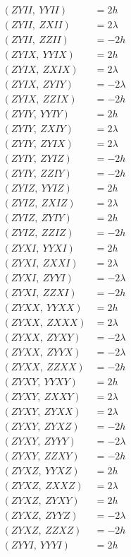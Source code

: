 \documentclass{article}
\begin{document}
\begin{align*}
  (ZYII,\ YYII) &= 2 h \\
  (ZYII,\ ZXII) &= 2 \lambda \\
  (ZYII,\ ZZII) &= - 2 h \\
  (ZYIX,\ YYIX) &= 2 h \\
  (ZYIX,\ ZXIX) &= 2 \lambda \\
  (ZYIX,\ ZYIY) &= - 2 \lambda \\
  (ZYIX,\ ZZIX) &= - 2 h \\
  (ZYIY,\ YYIY) &= 2 h \\
  (ZYIY,\ ZXIY) &= 2 \lambda \\
  (ZYIY,\ ZYIX) &= 2 \lambda \\
  (ZYIY,\ ZYIZ) &= - 2 h \\
  (ZYIY,\ ZZIY) &= - 2 h \\
  (ZYIZ,\ YYIZ) &= 2 h \\
  (ZYIZ,\ ZXIZ) &= 2 \lambda \\
  (ZYIZ,\ ZYIY) &= 2 h \\
  (ZYIZ,\ ZZIZ) &= - 2 h \\
  (ZYXI,\ YYXI) &= 2 h \\
  (ZYXI,\ ZXXI) &= 2 \lambda \\
  (ZYXI,\ ZYYI) &= - 2 \lambda \\
  (ZYXI,\ ZZXI) &= - 2 h \\
  (ZYXX,\ YYXX) &= 2 h \\
  (ZYXX,\ ZXXX) &= 2 \lambda \\
  (ZYXX,\ ZYXY) &= - 2 \lambda \\
  (ZYXX,\ ZYYX) &= - 2 \lambda \\
  (ZYXX,\ ZZXX) &= - 2 h \\
  (ZYXY,\ YYXY) &= 2 h \\
  (ZYXY,\ ZXXY) &= 2 \lambda \\
  (ZYXY,\ ZYXX) &= 2 \lambda \\
  (ZYXY,\ ZYXZ) &= - 2 h \\
  (ZYXY,\ ZYYY) &= - 2 \lambda \\
  (ZYXY,\ ZZXY) &= - 2 h \\
  (ZYXZ,\ YYXZ) &= 2 h \\
  (ZYXZ,\ ZXXZ) &= 2 \lambda \\
  (ZYXZ,\ ZYXY) &= 2 h \\
  (ZYXZ,\ ZYYZ) &= - 2 \lambda \\
  (ZYXZ,\ ZZXZ) &= - 2 h \\
  (ZYYI,\ YYYI) &= 2 h \\

\end{align*}
\end{document}
